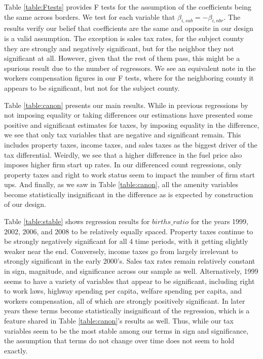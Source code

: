 Table \ref{table:Ftests} provides F tests for the assumption of the coefficients being the same across borders. We test for each variable that $\beta_{i,sub} = - \beta_{i,nbr}$. The results verify our belief that coefficients are the same and opposite in our design is a valid assumption. The exception is sales tax rates, for the subject county they are strongly and negatively significant, but for the neighbor they not significant at all. However, given that the rest of them pass, this might be a spurious result due to the number of regressors. We see an equivalent note in the workers compensation figures in our F tests, where for the neighboring county it appears to be significant, but not for the subject county.

Table \ref{table:canon} presents our main results. While in previous regressions by not imposing equality or taking differences our estimations have presented some positive and significant estimates for taxes, by imposing equality in the difference, we see that only tax variables that are negative and significant remain. This includes property taxes, income taxes, and sales taxes as the biggest driver of the tax differential. Weirdly, we see that a higher difference in the fuel price also imposes higher firm start up rates. In our differenced count regressions, only property taxes and right to work status seem to impact the number of firm start ups. And finally, as we saw in Table \ref{table:canon}, all the amenity variables become statistically insignificant in the difference as is expected by construction of our design.

Table \ref{table:stable} shows regression results for $births\_ratio$ for the years 1999, 2002, 2006, and 2008 to be relatively equally spaced. Property taxes continue to be strongly negatively significant for all 4 time periods, with it getting slightly weaker near the end. Conversely, income taxes go from largely irrelevant to strongly significant in the early 2000's. Sales tax rates remain relatively constant in sign, magnitude, and significance across our sample as well. Alternatively, 1999 seems to have a variety of variables that appear to be significant, including right to work laws, highway spending per capita, welfare spending per capita, and workers compensation, all of which are strongly positively significant. In later years these terms become statistically insignificant of the regression, which is a feature shared in Table \ref{table:canon}'s results as well. Thus, while our tax variables seem to be the most stable among our terms in sign and significance, the assumption that terms do not change over time does not seem to hold exactly.

